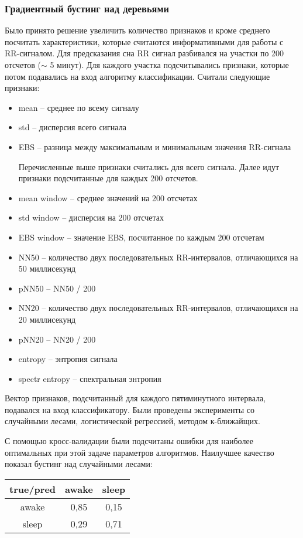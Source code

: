 \subsubsection{Градиентный бустинг над деревьями}

Было принято решение увеличить количество признаков и кроме среднего посчитать характеристики, которые считаются информативными для работы с RR-сигналом. Для предсказания сна RR сигнал разбивался на участки по 200 отсчетов ($\sim$ 5 минут). Для каждого участка подсчитывались признаки, которые потом подавались на вход алгоритму классификации.
Считали следующие признаки:

\begin{itemize}
	\item mean -- среднее по всему сигналу
	\item std -- дисперсия всего сигнала
	\item EBS -- разница между максимальным и минимальным значения RR-сигнала
	
	Перечисленные выше признаки считались для всего сигнала. Далее идут признаки подсчитанные для каждых 200 отсчетов.
	
	\item mean window -- среднее значений на 200 отсчетах
	\item std window -- дисперсия на 200 отсчетах
	\item EBS window -- значение EBS, посчитанное по каждым 200 отсчетам
	\item NN50 -- количество двух последовательных RR-интервалов, отличающихся на 50 миллисекунд
	\item pNN50 -- NN50 / 200
	\item NN20 -- количество двух последовательных RR-интервалов, отличающихся на 20 миллисекунд
	\item pNN20 -- NN20 / 200
	\item entropy -- энтропия сигнала
	\item spectr entropy -- спектральная энтропия
\end{itemize}

Вектор признаков, подсчитанный для каждого пятиминутного интервала, подавался на вход классификатору. Были проведены эксперименты со случайными лесами, логистической регрессией, методом к-ближайщих.

С помощью кросс-валидации были подсчитаны ошибки для наиболее оптимальных при этой задаче параметров алгоритмов.
Наилучшее качество показал бустинг над случайными лесами:

\begin{tabular}{|c|c|c|}
	\hline \rule[-2ex]{0pt}{5.5ex} true/pred & awake & sleep \\ 
	\hline \rule[-2ex]{0pt}{5.5ex} awake & 0,85 & 0,15 \\ 
	\hline \rule[-2ex]{0pt}{5.5ex} sleep & 0,29 & 0,71 \\ 
	\hline 
	
\end{tabular}\\

